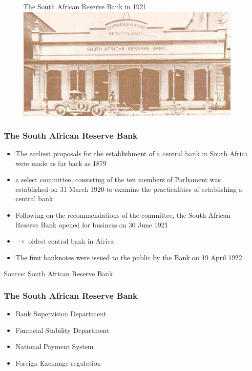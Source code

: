 \documentclass[11pt]{beamer}
\begin{document}
\begin{frame}
\begin{figure}
The South African Reserve Bank in 1921
\includegraphics[width=1\textwidth]{Sarb.png}
\end{figure}
\end{frame}

\begin{frame}
\frametitle{The South African Reserve Bank}
\begin{itemize}
\item The earliest proposals for the establishment of a central bank in South Africa were made as far back as 1879
\item a select committee, consisting of the ten members of Parliament was established on 31 March 1920 to examine the practicalities of establishing a central bank
\item Following on the recommendations of the committee, the South African Reserve Bank opened for business on 30 June 1921
\item $\rightarrow$ oldest central bank in Africa
\item The first banknotes were issued to the public by the Bank on 19 April 1922
\end{itemize}
\tiny{Source: South African Reserve Bank}
\end{frame}


\begin{frame}
\frametitle{The South African Reserve Bank}
\begin{itemize}
\item Bank Supervision Department
\item Financial Stability Department
\item National Payment System
\item Foreign Exchange regulation
\end{itemize}
\end{frame}
\end{document}
